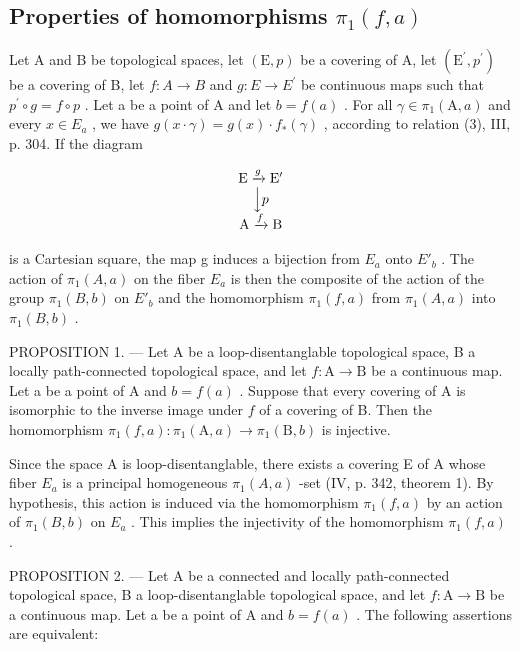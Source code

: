 \subsection{\texorpdfstring{Properties of homomorphisms \(\pi_{1}(f,a)\)}{Properties of homomorphisms pi\_1(f,a)}}

Let A and B be topological spaces, let \((\mathrm{E},p)\) be a covering of A, let \((\mathrm{E}^{\prime},p^{\prime})\) be a covering of B, let \(f\colon A\to B\) and \(g\colon E\to E^{\prime}\) be continuous maps such that \(p^{\prime}\circ g=f\circ p\) . Let a be a point of A and let \(b=f(a)\) . For all \(\gamma\in\pi_{1}(\mathrm{A},a)\) and every \(x\in E_{a}\) , we have \(g(x\cdot\gamma)=g(x)\cdot f_{*}(\gamma)\) , according to relation (3), III, p. 304. If the diagram

\[
\begin{array}{c} \mathrm{E} \xrightarrow {g} \mathrm{E} ^ {\prime} \\ \Big \downarrow p \\ \mathrm{A} \xrightarrow {f} \mathrm{B} \end{array}
\]

is a Cartesian square, the map g induces a bijection from \(E_{a}\) onto \(E'_{b}\) . The action of \(\pi_{1}(A,a)\) on the fiber \(E_{a}\) is then the composite of the action of the group \(\pi_{1}(B,b)\) on \(E'_{b}\) and the homomorphism \(\pi_{1}(f,a)\) from \(\pi_{1}(A,a)\) into \(\pi_{1}(B,b)\) .

PROPOSITION 1. --- Let A be a loop-disentanglable topological space, B a locally path-connected topological space, and let \(f\colon\mathrm{A}\to\mathrm{B}\) be a continuous map. Let a be a point of A and \(b=f(a)\) . Suppose that every covering of A is isomorphic to the inverse image under \(f\) of a covering of B. Then the homomorphism \(\pi_{1}(f,a)\colon\pi_{1}(\mathrm{A},a)\to\pi_{1}(\mathrm{B},b)\) is injective.

Since the space A is loop-disentanglable, there exists a covering E of A whose fiber \(E_{a}\) is a principal homogeneous \(\pi_{1}(A,a)\) -set (IV, p. 342, theorem 1). By hypothesis, this action is induced via the homomorphism \(\pi_{1}(f,a)\) by an action of \(\pi_{1}(B,b)\) on \(E_{a}\) . This implies the injectivity of the homomorphism \(\pi_{1}(f,a)\) .

PROPOSITION 2. --- Let A be a connected and locally path-connected topological space, B a loop-disentanglable topological space, and let \(f\colon\mathrm{A}\to\mathrm{B}\) be a continuous map. Let a be a point of A and \(b=f(a)\) . The following assertions are equivalent:

